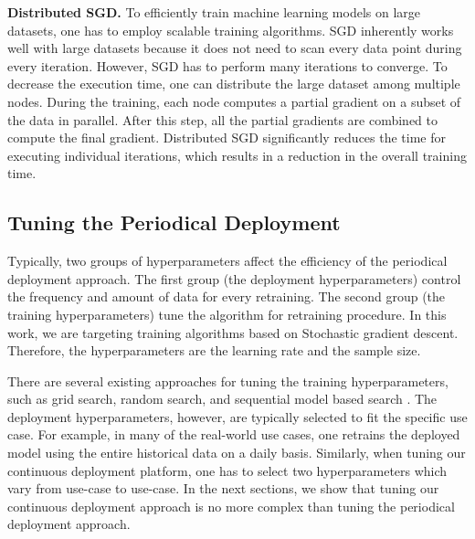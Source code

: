 \textbf{Distributed SGD.}
To efficiently train machine learning models on large datasets, one has to employ scalable training algorithms.
SGD inherently works well with large datasets because it does not need to scan every data point during every iteration.
However, SGD has to perform many iterations to converge.
To decrease the execution time, one can distribute the large dataset among multiple nodes.
During the training, each node computes a partial gradient on a subset of the data in parallel.
After this step, all the partial gradients are combined to compute the final gradient.
Distributed SGD significantly reduces the time for executing individual iterations, which results in a reduction in the overall training time.

\subsection{Tuning the Periodical Deployment}
Typically, two groups of hyperparameters affect the efficiency of the periodical deployment approach.
The first group (the deployment hyperparameters) control the frequency and amount of data for every retraining.
The second group (the training hyperparameters) tune the algorithm for retraining procedure.
In this work, we are targeting training algorithms based on Stochastic gradient descent.
Therefore, the hyperparameters are the learning rate and the sample size.

There are several existing approaches for tuning the training hyperparameters, such as grid search, random search, and sequential model based search \cite{bergstra2012random}.
The deployment hyperparameters, however, are typically selected to fit the specific use case.
For example, in many of the real-world use cases, one retrains the deployed model using the entire historical data on a daily basis.
Similarly, when tuning our continuous deployment platform, one has to select two hyperparameters which vary from use-case to use-case.
In the next sections, we show that tuning our continuous deployment approach is no more complex than tuning the periodical deployment approach.

